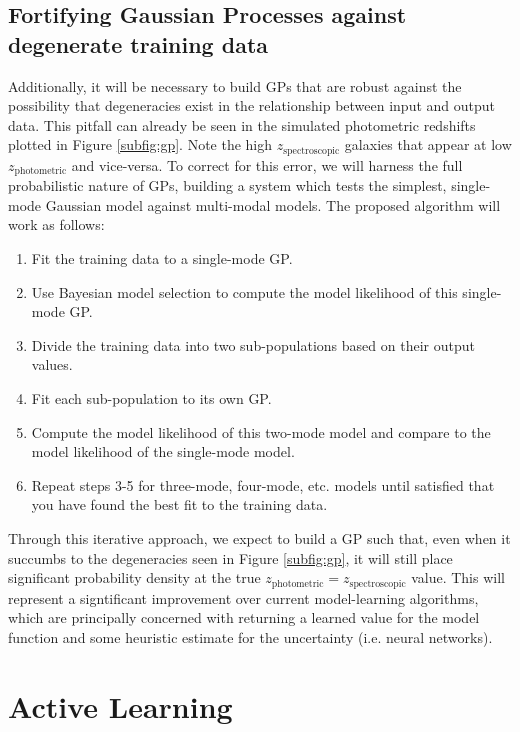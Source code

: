 \documentclass[useAMS,usenatbib,tightenlines,11pt,preprint]{aastex}
\begin{document}
\subsection{Fortifying Gaussian Processes against degenerate training data}

Additionally, it will be necessary to build GPs that are robust against the
possibility that degeneracies exist in the relationship between input and output
data.  This pitfall can already be seen in the simulated photometric redshifts
plotted in Figure \ref{subfig:gp}.  Note the high
$z_\text{spectroscopic}$ galaxies that appear at low $z_\text{photometric}$ and
vice-versa.  To correct for this error, we will harness the full probabilistic
nature of GPs, building a system which tests the simplest, single-mode Gaussian
model against multi-modal models.  The proposed algorithm will work as follows:
\begin{enumerate}
\item Fit the training data to a single-mode GP.

\item Use Bayesian model selection \cite{mackay}
to compute the model likelihood of this single-mode GP.

\item Divide the training data into two sub-populations based on their output
values.

\item Fit each sub-population to its own GP.

\item Compute the model likelihood of this two-mode model and compare to the
model likelihood of the single-mode model.

\item Repeat steps 3-5 for three-mode, four-mode, etc. models until
satisfied that you have found the best fit to the training data.
\end{enumerate}
Through this iterative approach, we expect to build a GP such that, even when it
succumbs to the degeneracies seen in Figure \ref{subfig:gp}, it will still place
significant probability density at the true
$z_\text{photometric}=z_\text{spectroscopic}$ value.  This will represent a
signtificant improvement over current model-learning algorithms, which are
principally concerned with returning a learned value for the model function and
some heuristic estimate for the uncertainty (i.e. neural networks).

\section{Active Learning}
\end{document}
